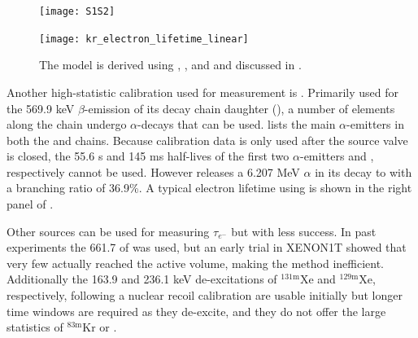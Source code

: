 \begin{figure}
\centering
\texttt{[image: S1S2]}
\label{fig:calibrations_kr_s1_s2}
\end{figure}

\begin{figure}
\centering
\texttt{[image: kr\_electron\_lifetime\_linear]}
\caption{The model is derived using , , and  \alphadecays and
discussed in .}
\label{fig:det_char_elifetime_kr}
\end{figure}

Another high-statistic calibration used for measurement is .  Primarily used for the 569.9 keV $\beta$-emission of its
decay chain daughter  (), a number of elements along the chain
undergo $\alpha$-decays that can be
used.   lists the main $\alpha$-emitters in both the  and  chains.  Because calibration
data is only used after the source valve is closed, the 55.6 s and 145 ms half-lives of the first two $\alpha$-emitters  and
, respectively cannot be used.  However  releases a 6.207 MeV $\alpha$ in its decay to  with a
branching ratio of 36.9\%.  A typical electron lifetime using  is shown in the right panel of
.

Other sources can be used for measuring $\tau_{e^-}$ but with less success.  In past experiments the 661.7 \gammaray of  was
used, but an early trial in XENON1T showed that very few actually reached the active volume, making the method inefficient.  Additionally
the 163.9 and 236.1 keV de-excitations of $\mathrm{^{131m}Xe}$ and $\mathrm{^{129m}Xe}$, respectively, following a nuclear recoil calibration are
usable initially but longer time windows are required as they de-excite, and they do not offer the large statistics of $\mathrm{^{83m}Kr}$
or .

